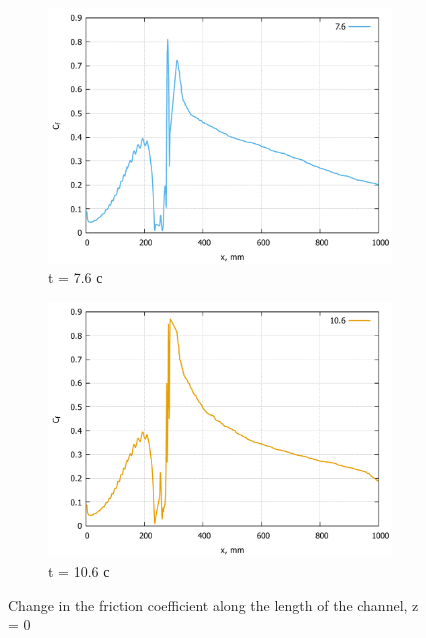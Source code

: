\begin{figure}[H]
\begin{subfigure}{.5\textwidth}
			\includegraphics[width=1\linewidth]{../Assets/Cf-T760}
			\caption{t = 7.6 с}
			\label{fig:Cf-T760}
		\end{subfigure}%
		\begin{subfigure}{.5\textwidth}
			\centering
			\includegraphics[width=1\linewidth]{../Assets/Cf-T1060}
			\caption{t = 10.6 с}
			\label{fig:Cf-T1060}
		\end{subfigure}
		\caption{Change in the friction coefficient along the length of the channel, z = 0}
		\label{fig:cf}
	\end{figure}
